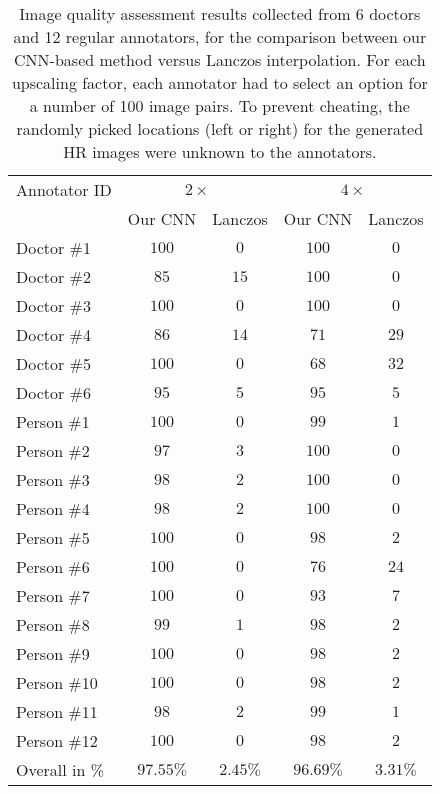 \documentclass{ieeeaccess}
\begin{document}
\begin{table}[!t]
\caption{Image quality assessment results collected from 6 doctors and 12 regular annotators, for the comparison between our CNN-based method versus Lanczos interpolation. For each upscaling factor, each annotator had to select an option for a number of 100 image pairs. To prevent cheating, the randomly picked locations (left or right) for the generated HR images were unknown to the annotators.}\label{tab_human}
\begin{center}
\begin{tabular}{|l|c|c|c|c|}
\hline 
Annotator ID  & \multicolumn{2}{|c|}{$2\times$} & \multicolumn{2}{|c|}{$4\times$} \\
\cline{2-5}   & Our CNN           & Lanczos           & Our CNN           & Lanczos \\
\hline   
\hline
Doctor {\#}1          & $100$ & $0$ & $100$ & $0$\\ 
\hline  
Doctor {\#}2          & $85$ & $15$ & $100$ & $0$\\   
\hline 
Doctor {\#}3          & $100$ & $0$ & $100$ & $0$\\  
\hline  
Doctor {\#}4          & $86$ & $14$ & $71$ & $29$\\ 
\hline  
Doctor {\#}5          & $100$ & $0$ & $68$ & $32$\\ 
\hline  
Doctor {\#}6          & $95$ & $5$ & $95$ & $5$\\  
\hline
Person {\#}1          & $100$ & $0$ & $99$ & $1$\\ 
\hline  
Person {\#}2          & $97$ & $3$ & $100$ & $0$\\ 
\hline  
Person {\#}3          & $98$ & $2$ & $100$ & $0$\\ 
\hline  
Person {\#}4          & $98$ & $2$ & $100$ & $0$\\   
\hline 
Person {\#}5          & $100$ & $0$ & $98$ & $2$\\  
\hline   
Person {\#}6          & $100$ & $0$ & $76$ & $24$\\ 
\hline  
Person {\#}7          & $100$ & $0$ & $93$ & $7$\\ 
\hline  
Person {\#}8          & $99$ & $1$ & $98$ & $2$\\ 
\hline  
Person {\#}9          & $100$ & $0$ & $98$ & $2$\\   
\hline 
Person {\#}10         & $100$ & $0$ & $98$ & $2$\\  
\hline 
Person {\#}11         & $98$ & $2$ & $99$ & $1$\\ 
\hline  
Person {\#}12         & $100$ & $0$ & $98$ & $2$\\ 
\hline  
Overall in \%         & $97.55 \%$ & $2.45  \%$ & $96.69\% $ & $3.31 \%$\\
\hline 
\end{tabular}
\end{center}
\end{table}
\end{document}
